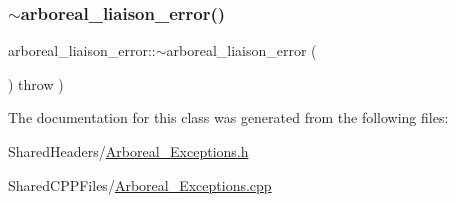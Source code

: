 \subsubsection{\texorpdfstring{$\sim$arboreal\+\_\+liaison\+\_\+error()}{~arboreal\_liaison\_error()}}
{\footnotesize\ttfamily arboreal\+\_\+liaison\+\_\+error\+::$\sim$arboreal\+\_\+liaison\+\_\+error (\begin{DoxyParamCaption}{ }\end{DoxyParamCaption}) throw  ) }



The documentation for this class was generated from the following files\+:\begin{DoxyCompactItemize}
\item 
Shared\+Headers/\mbox{\hyperlink{_arboreal___exceptions_8h}{Arboreal\+\_\+\+Exceptions.\+h}}\item 
Shared\+C\+P\+P\+Files/\mbox{\hyperlink{_arboreal___exceptions_8cpp}{Arboreal\+\_\+\+Exceptions.\+cpp}}\end{DoxyCompactItemize}
